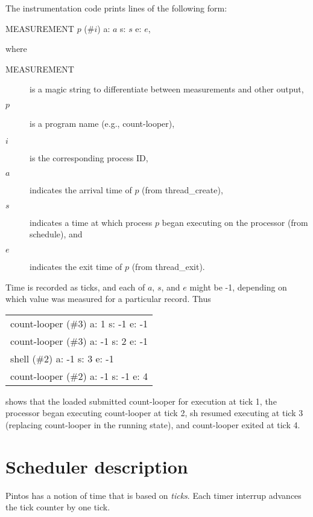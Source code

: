 \documentclass{article}
\newcommand{\command}[1]{{\sffamily#1}}
\newcommand{\procedure}[1]{{\sffamily#1}}
\begin{document}
The instrumentation code prints lines of the following form:
\begin{center}
\command{MEASUREMENT $p$ (\#$i$) a: $a$ s: $s$ e: $e$},
\end{center}
where
\begin{description}
\item[\textnormal{MEASUREMENT}] is a magic string to differentiate between measurements and other output,
\item[$p$] is a program name (e.g., \command{count-looper}),
\item[$i$] is the corresponding process ID,
\item[$a$] indicates the arrival time of $p$ (from \procedure{thread\_create}),
\item[$s$] indicates a time at which process $p$ began executing on the processor (from \procedure{schedule}), and
\item[$e$] indicates the exit time of $p$ (from \procedure{thread\_exit}).
\end{description}
Time is recorded as ticks,
and each of $a$, $s$, and $e$ might be -1, depending on which value was measured for a particular record.
Thus
\begin{center}
\begin{tabular}{l}
\command{count-looper (\#3) a: 1 s: -1 e: -1} \\
\command{count-looper (\#3) a: -1 s: 2 e: -1} \\
\command{shell (\#2) a: -1 s: 3 e: -1} \\
\command{count-looper (\#2) a: -1 s: -1 e: 4}
\end{tabular}
\end{center}
shows that the loaded submitted \command{count-looper} for execution at tick 1,
the processor began executing \command{count-looper} at tick 2,
\command{sh} resumed executing at tick 3 (replacing \command{count-looper} in the running state),
and \command{count-looper} exited at tick 4.

\section{Scheduler description}

Pintos has a notion of time that is based on \emph{ticks}. Each timer interrup
advances the tick counter by one tick.
\end{document}
